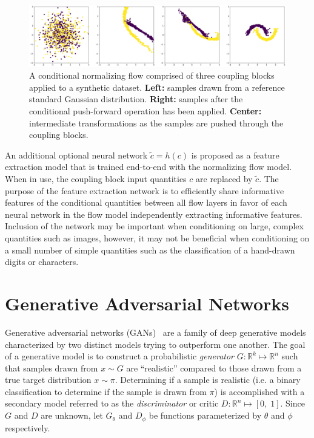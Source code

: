 \begin{figure}[htbp]
    \caption[Conditional normalizing flow density estimator on 2-d synthetic data]{
        A conditional normalizing flow comprised of three coupling blocks applied to a synthetic dataset.
        \textbf{Left:} samples drawn from a reference standard Gaussian distribution.
        \textbf{Right:} samples after the conditional push-forward operation has been applied.
        \textbf{Center:} intermediate transformations as the samples are pushed through the coupling blocks.
    }
    \begin{center}
        \setlength{\fboxsep}{0pt}%
        \setlength{\fboxrule}{1pt}%
        \includegraphics[width=150mm]{figs/two_moons_flow}
    \end{center}
    \label{fig:moon_flows}
\end{figure}

An additional optional neural network $\tilde{c} = h(c)$ is proposed as a feature extraction model that is trained
end-to-end with the normalizing flow model.
When in use, the coupling block input quantities $c$ are replaced by $\tilde{c}$.
The purpose of the feature extraction network is to efficiently share informative features of the
conditional quantities between all flow layers in favor of each neural network in the flow model independently
extracting informative features.
Inclusion of the network may be important when conditioning on large, complex quantities such as images, however, it
may not be beneficial when conditioning on a small number of simple quantities such as the classification of a hand-drawn
digits or characters.

\section{Generative Adversarial Networks}\label{sec:generative-adversarial-networks}

Generative adversarial networks (GANs)~\cite{gan_goodfellow} are a family of deep generative models characterized by two
distinct models trying to outperform one another.
The goal of a generative model is to construct a probabilistic \textit{generator} $G: \mathbb{R}^k \mapsto \mathbb{R}^n$ such
that samples drawn from $x \sim G$ are ``realistic'' compared to those drawn from a true target distribution $x \sim \pi$.
Determining if a sample is realistic  (i.e. a binary classification to determine if the sample is drawn from $\pi$) is
accomplished with a secondary model referred to as the \textit{discriminator} or critic $D: \mathbb{R}^n \mapsto [0, \; 1]$.
Since $G$ and $D$ are unknown, let $G_\theta$ and $D_\phi$ be functions parameterized by $\theta$ and $\phi$ respectively.

